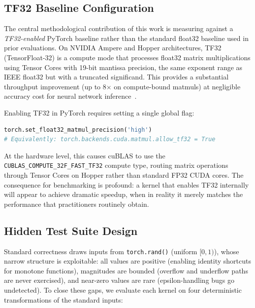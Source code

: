 \documentclass[11pt]{article}
\begin{document}
\subsection{TF32 Baseline Configuration}
\label{sec:tf32}

The central methodological contribution of this work is measuring against a \emph{TF32-enabled} PyTorch baseline rather than the standard float32 baseline used in prior evaluations. On NVIDIA Ampere and Hopper architectures, TF32 (TensorFloat-32) is a compute mode that processes float32 matrix multiplications using Tensor Cores with 19-bit mantissa precision, the same exponent range as IEEE float32 but with a truncated significand. This provides a substantial throughput improvement (up to 8$\times$ on compute-bound matmuls) at negligible accuracy cost for neural network inference~\cite{tf32nvidia}.

Enabling TF32 in PyTorch requires setting a single global flag:
\begin{lstlisting}[language=Python,caption={Enabling TF32 acceleration in PyTorch. This routes all float32 matmul and convolution operations through Tensor Cores.}]
torch.set_float32_matmul_precision('high')
# Equivalently: torch.backends.cuda.matmul.allow_tf32 = True
\end{lstlisting}

At the hardware level, this causes cuBLAS to use the \texttt{CUBLAS\_COMPUTE\_32F\_FAST\_TF32} compute type, routing matrix operations through Tensor Cores on Hopper rather than standard FP32 CUDA cores.
The consequence for benchmarking is profound: a kernel that enables TF32 internally will appear to achieve dramatic speedup, when in reality it merely matches the performance that practitioners routinely obtain.

\subsection{Hidden Test Suite Design}
\label{sec:hidden}

Standard correctness draws inputs from \texttt{torch.rand()} (uniform $[0,1)$), whose narrow structure is exploitable: all values are positive (enabling identity shortcuts for monotone functions), magnitudes are bounded (overflow and underflow paths are never exercised), and near-zero values are rare (epsilon-handling bugs go undetected). To close these gaps, we evaluate each kernel on four deterministic transformations of the standard inputs:
\end{document}
